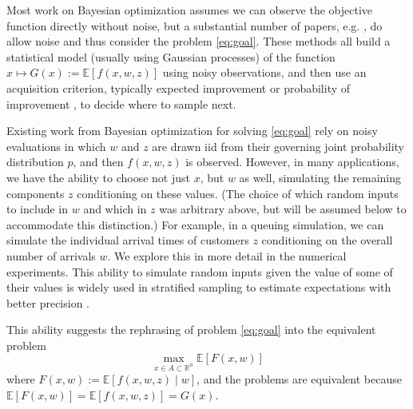 \documentclass{article} %
\newcommand{\w}{w}
\newcommand{\z}{z}
\newcommand{\pfcomment}[1]{{\color{red} PF: #1}}
\begin{document}
Most work on Bayesian optimization assumes we can observe the objective function directly without noise, but a substantial number of papers, e.g. \cite{villemonteix2009informational,huang2006global,scott2011correlated,brochu2010tutorial}, do allow noise and thus consider the problem \eqref{eq:goal}. These methods all build a statistical model (usually using Gaussian processes) of the function $x \mapsto G(x) := \mathbb{E}[f(x,\w,\z)]$ using noisy observations, and then use an acquisition criterion, typically expected improvement or probability of improvement \cite{brochu2010tutorial}, to decide where to sample next.

Existing work from Bayesian optimization for solving \eqref{eq:goal} rely on noisy evaluations in which $\w$ and $\z$ are drawn iid from their governing joint probability distribution $p$, and then $f(x,\w,\z)$ is observed.
However, in many applications, we have the ability to choose not just $x$, but $\w$ as well, simulating the remaining components $\z$ conditioning on these values.
(The choice of which random inputs to include in $\w$ and which in $\z$ was arbitrary above, but will be assumed below to accommodate this distinction.)
For example, in a queuing simulation, we can simulate the individual arrival times of customers $\z$ conditioning on the overall number of arrivals $\w$. We explore this in more detail in the numerical experiments. This ability to simulate random inputs given the value of some of their values is widely used in stratified sampling to estimate expectations with better precision \cite{glasserman2003monte}. 


This ability suggests the rephrasing of problem \eqref{eq:goal} into the equivalent problem
\begin{equation}
\max_{x\in A\subset\mathbb{R}^{n}}\mathbb{E}\left[F\left(x,\w\right)\right]
\label{eq:strata}
\end{equation} 
where $F\left(x,\w\right):=\mathbb{E}\left[f\left(x,\w,\z\right)\mid \w\right]$,
and the problems are equivalent because $\mathbb{E}[F(x,\w)]=\mathbb{E}\left[f\left(x,\w,\z\right)\right] = G(x)$.

\end{document}
